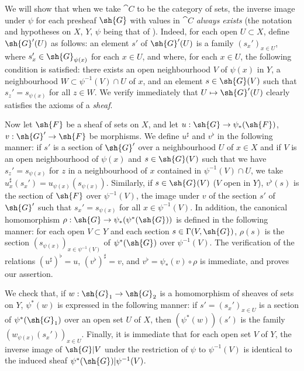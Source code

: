 \begin{env}[3.7.1]
\label{0.3.7.1}
We will show that when we take $\cat{C}$ to be the category of sets, the inverse
image under $\psi$ for each presheaf $\sh{G}$ with values in $\cat{C}$ \emph{always
exists} (the notation and hypotheses on $X$, $Y$, $\psi$ being that of
). Indeed, for each open $U\subset X$, define $\sh{G}'(U)$
as follows: an element $s'$ of $\sh{G}'(U)$ is a family $(s_x')_{x\in U}$, where
$s_x'\in\sh{G}_{\psi(x)}$ for each $x\in U$, and where, for each $x\in U$, the
following condition is satisfied: there exists an open neighbourhood $V$ of
$\psi(x)$ in $Y$, a neighbourhood $W\subset\psi^{-1}(V)\cap U$ of $x$, and an
element $s\in\sh{G}(V)$ such that $s_z'=s_{\psi(x)}$ for all $z\in W$. We verify
immediately that $U\mapsto\sh{G}'(U)$ clearly satisfies the axioms of a
\emph{sheaf}.

Now let $\sh{F}$ be a sheaf of sets on $X$, and let $u:\sh{G}\to\psi_*(\sh{F})$,
$v:\sh{G}'\to\sh{F}$ be morphisms. We define $u^\sharp$ and $v^\flat$ in the
following manner: if $s'$ is a section of $\sh{G}'$ over a neighbourhood $U$ of
$x\in X$ and if $V$ is an open neighbourhood of $\psi(x)$ and $s\in\sh{G}(V)$
such that we have $s_z'=s_{\psi(x)}$ for $z$ in a neighbourhood of $x$ contained
in $\psi^{-1}(V)\cap U$, we take $u_x^\sharp(s_x')=u_{\psi(x)}(s_{\psi(x)})$.
Similarly, if $s\in\sh{G}(V)$ ($V$ open in $Y$), $v^\flat(s)$ is the section of
$\sh{F}$ over $\psi^{-1}(V)$, the image under $v$ of the section $s'$ of
$\sh{G}'$ such that $s_x'=s_{\psi(x)}$ for all $x\in\psi^{-1}(V)$. In addition,
the canonical homomorphism 
$\rho:\sh{G}\to\psi_*(\psi^*(\sh{G}))$ is defined in the following manner: for
each open $V\subset Y$ and each section $s\in\Gamma(V,\sh{G})$, $\rho(s)$ is the
section $(s_{\psi(x)})_{x\in\psi^{-1}(V)}$ of $\psi^*(\sh{G})$ over
$\psi^{-1}(V)$. The verification of the relations $(u^\sharp)^\flat=u$,
$(v^\flat)^\sharp=v$, and $v^\flat=\psi_*(v)\circ\rho$ is immediate, and proves
our assertion.

We check that, if $w:\sh{G}_1\to\sh{G}_2$ is a homomorphism of sheaves of sets
on $Y$, $\psi^*(w)$ is expressed in the following manner: if
$s'=(s_x')_{x\in U}$ is a section of $\psi^*(\sh{G}_1)$ over an open set $U$ of
$X$, then $(\psi^*(w))(s')$ is the family $(w_{\psi(x)}(s_x'))_{x\in U}$.
Finally, it is immediate that for each open set $V$ of $Y$, the inverse image of
$\sh{G}|V$ under the restriction of $\psi$ to $\psi^{-1}(V)$ is identical to the
induced sheaf $\psi^*(\sh{G})|\psi^{-1}(V)$.


\end{env}
